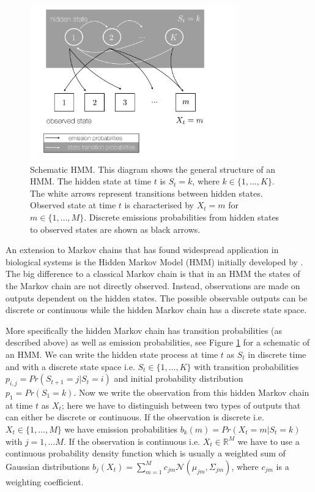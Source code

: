 \begin{figure}[!t]
\centering
\includegraphics[width=0.8\textwidth]{pics/hmm-schem.pdf}
\caption{Schematic HMM. This diagram shows the general structure of an HMM. The hidden state at time $t$ is $S_t=k$, where $k \in \{1, \ldots, K\}$. The white arrows represent transitions between hidden states. Observed state at time $t$ is characterised by $X_t =m $ for $m \in \{1, \ldots, M\}$. Discrete emissions probabilities from hidden states to observed states are shown as black arrows.}
\label{fig:hmm-schem}
\end{figure}

An extension to Markov chains that has found widespread application in biological systems is the Hidden Markov Model (HMM)  initially developed by \cite{Baum:1966cy}. The big difference to a classical Markov chain is that in an HMM the states of the Markov chain are not directly observed. Instead, observations are made on outputs dependent on the hidden states. The possible observable outputs can be discrete or continuous while the hidden Markov chain has a discrete state space.

More specifically the hidden Markov chain has transition probabilities (as described above) as well as emission probabilities, see Figure \ref{fig:hmm-schem} for a schematic of an HMM. We can write the hidden state process at time $t$ as $S_t$ in discrete time and with a discrete state space i.e. $S_t \in \lbrace 1, \ldots, K \rbrace$ with transition probabilities $p_{i,j} = Pr(S_{t+1} =j | S_t =i)$ and initial probability distribution $p_1 = Pr(S_1 = k)$. Now we write the observation from this hidden Markov chain at time $t$ as $X_t$; here we have to distinguish between two types of outputs that can either be discrete or continuous. If the observation is discrete i.e. $X_t \in \lbrace 1, \ldots, M \rbrace$ we have emission probabilities  $b_k(m) = Pr(X_t = m | S_t = k)$ with $j = 1, \ldots M$. If the observation is continuous i.e. $X_t \in \mathbb{R}^M$ we have to use a continuous probability density function which is usually a weighted sum of Gaussian distributions $b_j(X_t) = \sum_{m=1}^M c_{jm}\mathcal{N}(\mu_{jm}, \Sigma_{jm})$, where $c_{jm}$ is a weighting coefficient.

